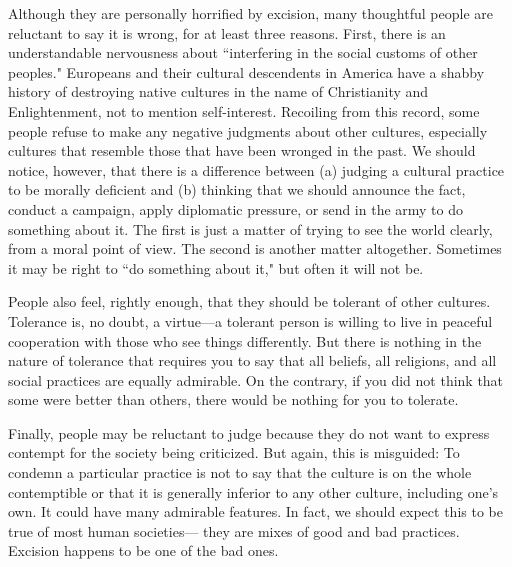 Although  they  are  personally  horrified  by  excision,  many  thoughtful 
people  are  reluctant  to  say  it  is  wrong,  for  at  least  three  reasons.  First, 
there  is  an  understandable  nervousness  about  ``interfering  in  the  social 
customs of other peoples." Europeans and their cultural descendents in 
America have a shabby history of destroying native cultures in the name 
of Christianity and Enlightenment, not to mention self-interest. Recoiling 
from  this  record,  some  people  refuse  to  make  any  negative  judgments 
about  other  cultures,  especially  cultures  that  resemble  those  that  have 
been  wronged  in  the  past.  We  should  notice,  however,  that  there  is  a 
difference between (a) judging a cultural practice to be morally deficient 
and (b) thinking that we should announce the fact, conduct a campaign, 
apply diplomatic pressure, or send in the army to do something about it. 
The  first  is  just  a  matter  of  trying to  see  the world clearly,  from  a  moral 
point  of  view.  The  second  is  another  matter  altogether.  Sometimes  it 
may be right to ``do something about it," but often it will not be. 

People  also  feel,  rightly  enough,  that  they  should  be  tolerant  of  other 
cultures. Tolerance is, no doubt, a virtue—a tolerant  person is willing to 
live  in  peaceful  cooperation  with  those  who  see  things  differently.  But 
there is nothing in the nature of tolerance that requires you to say that all 
beliefs,  all  religions,  and  all  social  practices  are  equally  admirable.  On 
the contrary, if you did not think that some were better than others, there 
would be nothing for you to tolerate. 

Finally,  people  may  be  reluctant  to  judge  because  they  do  not  want  to 
express  contempt  for  the  society  being  criticized.  But  again,  this  is 
misguided: To condemn a particular practice is not to say that the culture 
is  on  the  whole  contemptible  or  that  it  is  generally  inferior  to  any  other 
culture,  including  one's  own.  It  could  have  many  admirable  features.  In 
fact, we should expect this to be true of most human societies— they are 
mixes of good and bad practices. Excision happens to be one of the bad 
ones.

\setcounter{footnote}{\thefz}
